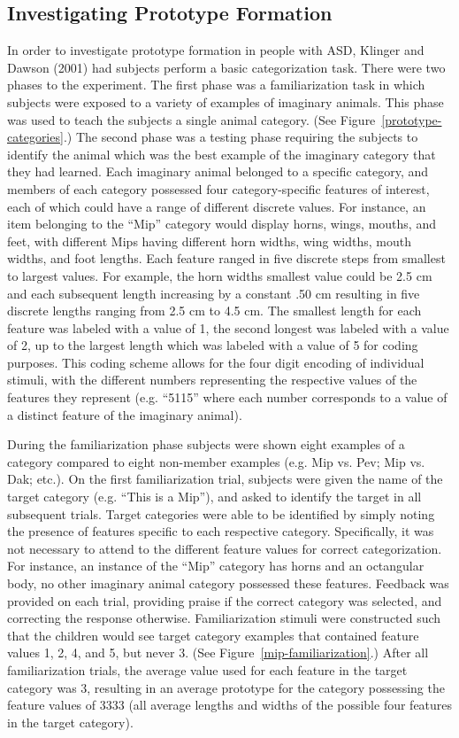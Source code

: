 \subsection{Investigating Prototype Formation}
In order to investigate prototype formation in people with ASD,  Klinger and Dawson (2001) had subjects perform a basic categorization task.  There were two phases to the experiment.  The first phase was a familiarization task in which subjects were exposed to a variety of examples of imaginary animals.  This phase was used to teach the subjects a single animal category. (See Figure~\ref{prototype-categories}.) The second phase was a testing phase requiring the subjects to identify the animal which was the best example of the imaginary category that they had learned.   Each imaginary animal belonged to a specific category, and members of each category possessed four category-specific features of interest, each of which could have a range of different discrete values.  For instance, an item belonging to the ``Mip'' category would display horns, wings, mouths, and feet, with different Mips having different horn widths, wing widths, mouth widths, and foot lengths.  Each feature ranged in five discrete steps from smallest to largest values.  For example, the horn widths smallest value could be 2.5 cm and each subsequent length increasing by a constant .50 cm resulting in five discrete lengths ranging from 2.5 cm to 4.5 cm.  The smallest length for each feature was labeled with a value of 1, the second longest was labeled with a value of 2, up to the largest length which was labeled with a value of 5 for coding purposes.  This coding scheme allows for the four digit encoding of individual stimuli, with the different numbers representing the respective values of the features they represent (e.g. ``5115'' where each number corresponds to a value of a distinct feature of the imaginary animal). 

During the familiarization phase subjects were shown eight examples of a category compared to eight non-member examples (e.g. Mip vs. Pev;  Mip vs. Dak; etc.).  On the first familiarization trial, subjects were given the name of the target category (e.g. ``This is a Mip''), and asked to identify the target in all subsequent trials.  Target categories were able to be identified by simply noting the presence of features specific to each respective category.  Specifically, it was not necessary to attend to the different feature values for correct categorization.  For instance, an instance of the ``Mip'' category has horns and an octangular body, no other imaginary animal category possessed these features.  Feedback was provided on each trial, providing praise if the correct category was selected, and correcting the response otherwise.  Familiarization stimuli were constructed such that the children would see target category examples that contained feature values 1, 2, 4, and 5, but never 3. (See Figure~\ref{mip-familiarization}.)  After all familiarization trials, the average value used for each feature in the target category was 3, resulting in an average prototype for the category possessing the feature values of 3333 (all average lengths and widths of the possible four features in the target category).  

